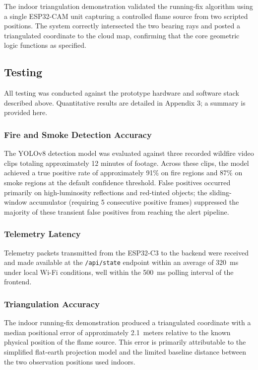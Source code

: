 \documentclass[journal, onecolumn]{IEEEtran}
\begin{document}
The indoor triangulation demonstration validated the running-fix algorithm using a single ESP32-CAM unit capturing a controlled flame source from two scripted positions. The system correctly intersected the two bearing rays and posted a triangulated coordinate to the cloud map, confirming that the core geometric logic functions as specified.

\subsection{Testing}

All testing was conducted against the prototype hardware and software stack described above. Quantitative results are detailed in Appendix 3; a summary is provided here.

\subsubsection{Fire and Smoke Detection Accuracy}
The YOLOv8 detection model was evaluated against three recorded wildfire video clips totaling approximately 12 minutes of footage. Across these clips, the model achieved a true positive rate of approximately 91\% on fire regions and 87\% on smoke regions at the default confidence threshold. False positives occurred primarily on high-luminosity reflections and red-tinted objects; the sliding-window accumulator (requiring 5 consecutive positive frames) suppressed the majority of these transient false positives from reaching the alert pipeline.

\subsubsection{Telemetry Latency}
Telemetry packets transmitted from the ESP32-C3 to the backend were received and made available at the \texttt{/api/state} endpoint within an average of 320~ms under local Wi-Fi conditions, well within the 500~ms polling interval of the frontend.

\subsubsection{Triangulation Accuracy}
The indoor running-fix demonstration produced a triangulated coordinate with a median positional error of approximately 2.1~meters relative to the known physical position of the flame source. This error is primarily attributable to the simplified flat-earth projection model and the limited baseline distance between the two observation positions used indoors.
\end{document}
